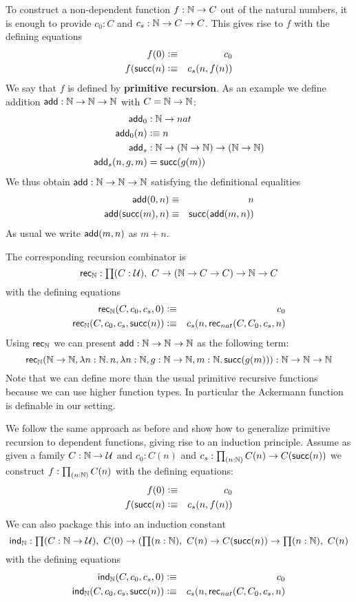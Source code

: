 To construct a non-dependent function $f : \mathbb{N} \to C$ out of the natural numbers, it is enough to provide $c_0 : C$ and $c_s : \mathbb{N} \to C \to C$. This gives rise to $f$ with the defining equations
\begin{eqnarray*}
  f(0) & \vcentcolon\equiv & c_0 \\
  f(\mathsf{succ}(n) & \vcentcolon\equiv & c_s(n,f(n))
\end{eqnarray*}
We say that $f$ is defined by \textbf{primitive recursion}. As an example we define addition $\mathsf{add} : \mathbb{N} \to \mathbb{N} \to \mathbb{N}$ with $C = \mathbb{N} \to \mathbb{N}$:
\begin{align*}
  \mathsf{add}_0 & : \mathbb{N} \to nat \\
  \mathsf{add}_0 (n) & \vcentcolon\equiv n \\
  \mathsf{add}_s & : \mathbb{N} \to (\mathbb{N} \to \mathbb{N}) \to (\mathbb{N} \to \mathbb{N}) \\
  \mathsf{add}_s(n,g,m) & = \mathsf{succ}(g(m))
\end{align*}
We thus obtain $\mathsf{add} : \mathbb{N} \to \mathbb{N} \to \mathbb{N}$ satisfying the definitional equalities
\begin{eqnarray*}
  \mathsf{add}(0,n) & \equiv & n \\
  \mathsf{add}(\mathsf{succ}(m),n) & \equiv & \mathsf{succ}(\mathsf{add}(m,n)) 
\end{eqnarray*}
As usual we write $\mathsf{add}(m,n)$ as $m+n$. 

The corresponding recursion combinator is 
\[\rec{\nat}  : \prd{C:\UU} C \to (\nat \to C \to C) \to \nat \to C \]
with the defining equations
\begin{eqnarray*}
\mathsf{rec}_{\mathbb{N}}(C,c_0,c_s,0)  & \vcentcolon\equiv & c_0 \\
\mathsf{rec}_{\mathbb{N}}(C,c_0,c_s,\mathsf{succ}(n)) & \vcentcolon\equiv & c_s(n,\mathsf{rec}_{nat}(C,C_0,c_s,n)  
\end{eqnarray*}
Using $\mathsf{rec}_{\mathbb{N}}$ we can present $\mathsf{add} : \mathbb{N} \to \mathbb{N} \to \mathbb{N}$ as the following term:
\[
\rec{\nat}(\nat \to \nat,\lam{n:\nat} n,\lam{n:\nat,g:\nat \to \nat,m :\nat} \suc(g(m))) : \nat \to \nat \to \nat  
\]
Note that we can define more than the usual primitive recursive functions because we can use higher function types. 
In particular the Ackermann function is definable in our setting.

We follow the same approach as before and show how to generalize primitive recursion to dependent functions, giving rise to an induction principle. Assume as given a family $C : \mathbb{N} \to \mathcal{U}$ and $c_0 : C(n)$ and $c_s : \prd{n:\nat} C(n) \to C(\suc(n))$ we construct $f : \prd{n:\nat} C(n)$ with the defining equations:
\begin{eqnarray*}
  f(0) & \vcentcolon\equiv & c_0 \\
  f(\mathsf{succ}(n) & \vcentcolon\equiv & c_s(n,f(n))
\end{eqnarray*}
We can also package this into an induction constant
\[\ind{\nat}  : \prd{C:\nat\to \UU} C(0) \to (\prd{n : \nat} C(n) \to C(\suc(n)) \to \prd{n : \nat} C(n) \]
with the defining equations
\begin{eqnarray*}
\mathsf{ind}_{\mathbb{N}}(C,c_0,c_s,0)  & \vcentcolon\equiv & c_0 \\
\mathsf{ind}_{\mathbb{N}}(C,c_0,c_s,\mathsf{succ}(n)) & \vcentcolon\equiv & c_s(n,\mathsf{rec}_{nat}(C,C_0,c_s,n)  
\end{eqnarray*}

